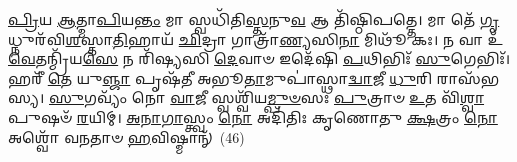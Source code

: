 \-\ul{𑌪𑍍𑌰𑌿}\-𑌯 \ul{𑌆}\-𑌤𑍍𑌮𑌾\-\ul{𑌪𑌿}\-𑌯\-\ul{𑌨𑍍𑌤𑌂} 𑌮𑌾 𑌸𑍍𑌵𑌧𑌿᳴𑌤𑌿\-\ul{𑌸𑍍𑌤}\-𑌨𑍁\-\ul{𑌵} 𑌆 𑌤𑌿᳴𑌷𑍍𑌠𑌿𑌪𑌤𑍍𑌤𑍇। 𑌮𑌾 𑌤𑍇᳴ \ul{𑌗𑍃}\-𑌧𑍍𑌨𑍁𑌰᳴𑌵𑌿\-\ul{𑌶}\-𑌸𑍍𑌤𑌾\-\ul{𑌤𑌿}\-𑌹𑌾𑌯᳴ \ul{𑌛𑌿}\-𑌦𑍍𑌰𑌾 𑌗𑌾𑌤𑍍𑌰𑌾᳴\-\ul{𑌣𑍍𑌯}\-𑌸𑌿\-\ul{𑌨𑌾} 𑌮𑌿𑌥𑍂᳴ 𑌕𑌃। 𑌨 𑌵𑌾 𑌉᳴ \ul{𑌵𑍇}\-𑌤𑌨𑍍𑌮𑍍𑌰𑌿᳴𑌯\-\ul{𑌸𑍇} 𑌨 𑌰𑌿᳴𑌷𑍍𑌯𑌸𑌿 \ul{𑌦𑍇}\-𑌵𑌾𑍞 𑌇𑌦𑍇᳴𑌷𑌿 \ul{𑌪}\-𑌥𑌿𑌭𑌿𑌃᳴ \ul{𑌸𑍁}\-𑌗𑍇𑌭𑌿𑌃᳴। 𑌹𑌰𑍀᳴ \ul{𑌤𑍇} 𑌯𑍁\-\ul{𑌞𑍍𑌜𑌾} 𑌪𑍃𑌷᳴𑌤𑍀 𑌅𑌭𑍂\-\ul{𑌤𑌾}\-𑌮𑍁𑌪𑌾॑𑌸𑍍𑌥𑌾\-\ul{𑌦𑍍𑌵𑌾}\-𑌜𑍀 \ul{𑌧𑍁}\-𑌰𑌿 𑌰𑌾𑌸᳴𑌭𑌸𑍍𑌯। \ul{𑌸𑍁}\-𑌗𑌵𑍍𑌯𑌂᳴ 𑌨𑍋 \ul{𑌵𑌾}\-𑌜𑍀 𑌸𑍍𑌵𑌶𑍍𑌵𑌿᳴𑌯\-\ul{𑌮𑍍𑌪𑍁}\-\-\ul{𑍞}\-𑌸𑌃 \ul{𑌪𑍁}\-𑌤𑍍𑌰𑌾𑍞 \ul{𑌉}\-𑌤 𑌵𑌿᳴\-\ul{𑌶𑍍𑌵𑌾}\-𑌪𑍁𑌷𑍞᳴ \ul{𑌰}\-𑌯𑌿𑌮𑍍। \ul{𑌅}\-\-\ul{𑌨𑌾}\-\-\ul{𑌗𑌾}\-𑌸𑍍𑌤𑍍𑌵𑌂 \ul{𑌨𑍋} 𑌅𑌦𑌿᳴𑌤𑌿𑌃 𑌕𑍃𑌣𑍋𑌤𑍁 \ul{𑌕𑍍𑌷}\-𑌤𑍍𑌰𑌂 \ul{𑌨𑍋} 𑌅𑌶𑍍𑌵𑍋᳴ 𑌵𑌨𑌤𑌾𑍞 \ul{𑌹}\-𑌵𑌿𑌷𑍍𑌮𑌾𑌨𑍍᳴~(46)


{\anuvakamend[{\-\ul{𑌘𑌾}\-𑌸𑌿𑌂 𑌕𑌶᳴𑌯𑌾 𑌤𑌪\-\ul{𑌦𑍍𑌰}\-𑌯𑌿𑌂 𑌨𑌵᳴ 𑌚}]}%
